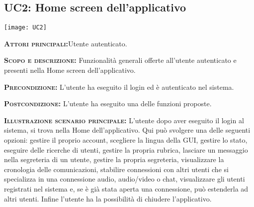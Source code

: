 \subsection{UC2: Home screen dell'applicativo}
\begin{center}
\texttt{[image: UC2]}
\end{center}
\begin{description}
\item{\scshape\bfseries Attori principali:}Utente autenticato.
\item{\scshape\bfseries Scopo e descrizione:} Funzionalità generali offerte all'utente autenticato e presenti nella Home screen dell'applicativo.
\item{\scshape\bfseries Precondizione:} L'utente ha eseguito il login ed è autenticato nel sistema.
\item{\scshape\bfseries Postcondizione:} L'utente ha eseguito una delle funzioni proposte.
\item{\scshape\bfseries Illustrazione scenario principale:} L'utente dopo aver eseguito il login al sistema, si trova nella Home dell'applicativo. Qui può svolgere una delle seguenti opzioni: gestire il proprio account, scegliere la lingua della GUI, gestire lo stato, eseguire delle ricerche di utenti, gestire la propria rubrica, lasciare un messaggio nella segreteria di un utente, gestire la propria segreteria, visualizzare la cronologia delle comunicazioni, stabilire connessioni con altri utenti che si specializza in una connessione audio, audio/video o chat, visualizzare gli utenti registrati nel sistema e, se è già stata aperta una connessione, può estenderla ad altri utenti. Infine l'utente ha la possibilità di chiudere l'applicativo.
\end{description}

